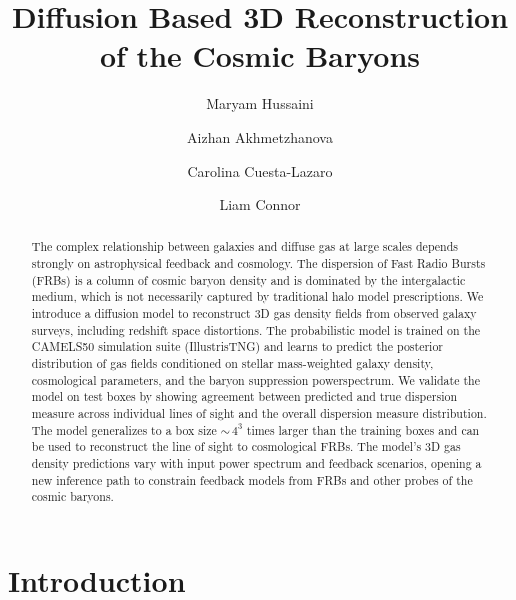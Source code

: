 \documentclass[twocolumn]{aastex631}
\begin{document}
\title{Diffusion Based 3D Reconstruction of the Cosmic Baryons}

\author[0000-0001-9580-1043]{Maryam Hussaini}

\author[0009-0004-3662-2263]{Aizhan Akhmetzhanova}

\author[0000-0002-6069-2999]{Carolina Cuesta-Lazaro}

\author[0000-0002-7587-6352]{Liam Connor}


\begin{abstract}
The complex relationship between galaxies and diffuse gas at large scales depends strongly on astrophysical feedback and cosmology. The dispersion of Fast Radio Bursts (FRBs) is a column of cosmic baryon density and is dominated by the intergalactic medium, which is not necessarily captured by traditional halo model prescriptions. We introduce a diffusion model to reconstruct 3D gas density fields from observed galaxy surveys, including redshift space distortions. The probabilistic model is trained on the CAMELS50 simulation suite (IllustrisTNG) and learns to predict the posterior distribution of gas fields conditioned on stellar mass-weighted galaxy density, cosmological parameters, and the baryon suppression powerspectrum. We validate the model on test boxes by showing agreement between predicted and true dispersion measure across individual lines of sight and the overall dispersion measure distribution.
The model generalizes to a box size $\sim\,4^3$ times larger than the training boxes and can be used to reconstruct the line of sight to cosmological FRBs. The model's 3D gas density predictions vary with input power spectrum and feedback scenarios, opening a new inference path to constrain feedback models from FRBs and other probes of the cosmic baryons. 
\end{abstract}

\section{Introduction}
\label{sec:intro}
\end{document}
